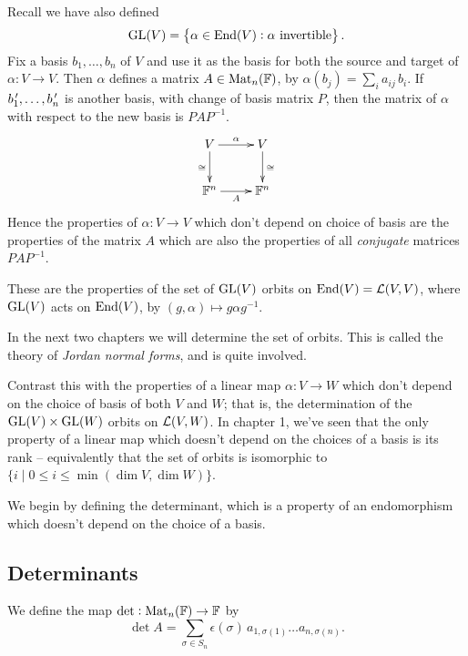 Recall we have also defined
\begin{equation*}
	\operatorname{GL}(V) = \left\{\alpha\in\operatorname{End}(V):\alpha \text{ invertible}\right\}.
\end{equation*}
Fix a basis $b_1,\ldots,b_n$ of $V$ and use it as the basis for both the source and target of $\alpha:V\to V$. Then $\alpha$ defines a matrix $A\in\operatorname{Mat}_n(\mathbb{F})$,  by $\alpha(b_j) = \sum_i a_{ij} \,b_i$. If $b^{\,\prime}_1,\ldots,b^{\,\prime}_n$ is another basis, with change of basis matrix $P$, then the matrix of $\alpha$ with respect to the new basis is $PAP^{-1}$.
\begin{equation*}
	\xymatrix{
		V
			\ar[r]^\alpha
			\ar[d]_\cong
		&
		V
			\ar[d]^\cong
		\\
		\Fn
			\ar[r]_A
		&
		\Fn
	}
\end{equation*}
Hence the properties of $\alpha:V\to V$ which don't depend on choice of basis are  the properties of the matrix $A$ which are also the properties of all \emph{conjugate} matrices $PAP^{-1}$.

These are the properties of the set of $\operatorname{GL}(V)$ orbits on $\operatorname{End}(V)=\operatorname{\mathcal{L}}(V,V)$, where $\operatorname{GL}(V)$ acts on $ \operatorname{End}(V)$, by  $(g,\alpha)\mapsto g\alpha g^{-1}$.

In the next two chapters we will determine the set of orbits. This is called the theory of \emph{Jordan normal forms}, and is quite involved. 

Contrast this with the properties of a linear map $\alpha : V \to W$ which don't depend on the choice of basis of both $V$ and $W$; that is, the determination of the $\operatorname{GL}(V)\times \operatorname{GL}(W)$ orbits on $\operatorname{\mathcal{L}}(V,W)$. In chapter 1, we've seen that the only property of a linear map which doesn't depend on the choices of a basis is its rank -- equivalently that the set of orbits is isomorphic to $\{i \mid 0\leq i\leq \min(\dim V,\dim W)\}$.

We begin by defining the determinant, which is a property of an endomorphism which doesn't depend on the choice of a basis.

	\pagebreak

\subsection{Determinants} %
\label{sub:determinants}

\begin{definition}
	We define the map $\det:\operatorname{Mat}_n(\mathbb{F}) \to \mathbb{F}$ by %
	\begin{equation*}
		\det A=\sum_{\sigma\in S_n} \epsilon(\sigma)\,a_{1,\sigma(1)}\ldots a_{n,\sigma(n)}.
	\end{equation*}

\end{definition}

